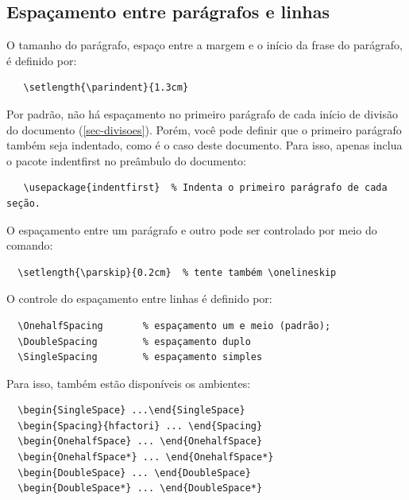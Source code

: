 \documentclass[article,12pt,oneside,a4paper,chapter=TITLE,english,brazil]{abntex2}
\begin{document}
\begin{anexosenv}
\section{Espaçamento entre parágrafos e linhas}

O tamanho do parágrafo, espaço entre a margem e o início da frase do parágrafo, é definido por:
\begin{verbatim}
   \setlength{\parindent}{1.3cm}
\end{verbatim}

Por padrão, não há espaçamento no primeiro parágrafo de cada início de divisão do documento (\autoref{sec-divisoes}). Porém, você pode definir que o primeiro parágrafo também seja indentado, como é o caso deste documento. Para isso, apenas inclua o pacote \textsf{indentfirst} no preâmbulo do documento:
\begin{verbatim}
   \usepackage{indentfirst}  % Indenta o primeiro parágrafo de cada seção.
\end{verbatim}

O espaçamento entre um parágrafo e outro pode ser controlado por meio do comando:
\begin{verbatim}
  \setlength{\parskip}{0.2cm}  % tente também \onelineskip
\end{verbatim}

O controle do espaçamento entre linhas é definido por:
\begin{verbatim}
  \OnehalfSpacing       % espaçamento um e meio (padrão); 
  \DoubleSpacing        % espaçamento duplo
  \SingleSpacing        % espaçamento simples	
\end{verbatim}

Para isso, também estão disponíveis os ambientes:
\begin{verbatim}
  \begin{SingleSpace} ...\end{SingleSpace}
  \begin{Spacing}{hfactori} ... \end{Spacing}
  \begin{OnehalfSpace} ... \end{OnehalfSpace}
  \begin{OnehalfSpace*} ... \end{OnehalfSpace*}
  \begin{DoubleSpace} ... \end{DoubleSpace}
  \begin{DoubleSpace*} ... \end{DoubleSpace*} 
\end{verbatim}


\end{anexosenv}
\end{document}

